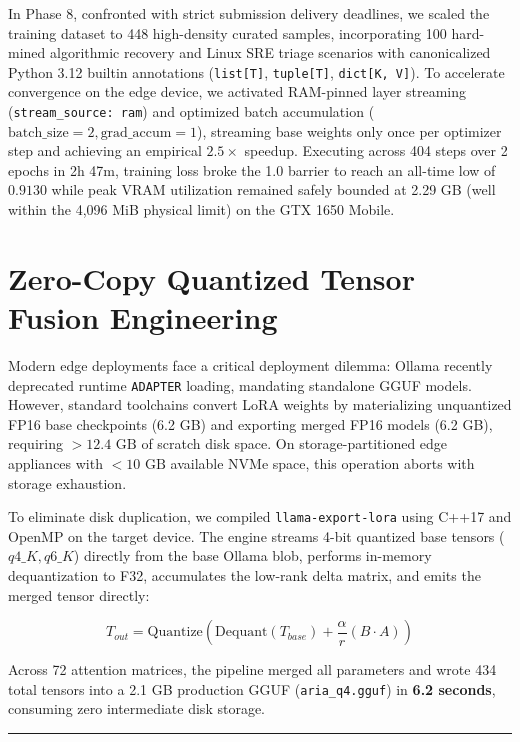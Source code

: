 \documentclass[10pt,a4paper]{article}
\begin{document}
In Phase 8, confronted with strict submission delivery deadlines, we scaled the training dataset to 448 high-density curated samples, incorporating 100 hard-mined algorithmic recovery and Linux SRE triage scenarios with canonicalized Python 3.12 builtin annotations (\texttt{list[T]}, \texttt{tuple[T]}, \texttt{dict[K, V]}). To accelerate convergence on the edge device, we activated RAM-pinned layer streaming (\texttt{stream\_source: ram}) and optimized batch accumulation ($\text{batch\_size}=2, \text{grad\_accum}=1$), streaming base weights only once per optimizer step and achieving an empirical $2.5\times$ speedup. Executing across 404 steps over 2 epochs in 2h 47m, training loss broke the 1.0 barrier to reach an all-time low of $\mathbf{0.9130}$ while peak VRAM utilization remained safely bounded at 2.29 GB (well within the 4,096 MiB physical limit) on the GTX 1650 Mobile.

\section{Zero-Copy Quantized Tensor Fusion Engineering}

Modern edge deployments face a critical deployment dilemma: Ollama recently deprecated runtime \texttt{ADAPTER} loading, mandating standalone GGUF models. However, standard toolchains convert LoRA weights by materializing unquantized FP16 base checkpoints (6.2 GB) and exporting merged FP16 models (6.2 GB), requiring $>12.4\text{ GB}$ of scratch disk space. On storage-partitioned edge appliances with $<10\text{ GB}$ available NVMe space, this operation aborts with storage exhaustion.

To eliminate disk duplication, we compiled \texttt{llama-export-lora} using C++17 and OpenMP on the target device. The engine streams 4-bit quantized base tensors ($q4\_K, q6\_K$) directly from the base Ollama blob, performs in-memory dequantization to F32, accumulates the low-rank delta matrix, and emits the merged tensor directly:

\begin{equation}
T_{out} = \text{Quantize}\left(\text{Dequant}(T_{base}) + \frac{\alpha}{r} (B \cdot A)\right)
\end{equation}

Across 72 attention matrices, the pipeline merged all parameters and wrote 434 total tensors into a 2.1 GB production GGUF (\texttt{aria\_q4.gguf}) in \textbf{6.2 seconds}, consuming zero intermediate disk storage.

\vspace{3pt}
\hrule
\vspace{5pt}
\end{document}
